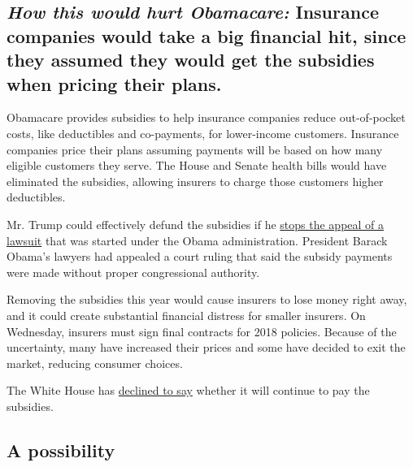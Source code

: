 \hypertarget{how-this-would-hurt-obamacare-insurance-companies-would-take-a-big-financial-hit-since-they-assumed-they-would-get-the-subsidies-when-pricing-their-plans}{%
\subsection{\texorpdfstring{\emph{How this would hurt Obamacare:}
Insurance companies would take a big financial hit, since they assumed
they would get the subsidies when pricing their
plans.}{How this would hurt Obamacare: Insurance companies would take a big financial hit, since they assumed they would get the subsidies when pricing their plans.}}\label{how-this-would-hurt-obamacare-insurance-companies-would-take-a-big-financial-hit-since-they-assumed-they-would-get-the-subsidies-when-pricing-their-plans}}

Obamacare provides subsidies to help insurance companies reduce
out-of-pocket costs, like deductibles and co-payments, for lower-income
customers. Insurance companies price their plans assuming payments will
be based on how many eligible customers they serve. The House and Senate
health bills would have eliminated the subsidies, allowing insurers to
charge those customers higher deductibles.

Mr. Trump could effectively defund the subsidies if he
\href{https://www.nytimes3xbfgragh.onion/2017/03/24/upshot/trumps-choice-on-obamacare-sabotage-or-co-opt.html}{stops
the appeal of a lawsuit} that was started under the Obama
administration. President Barack Obama's lawyers had appealed a court
ruling that said the subsidy payments were made without proper
congressional authority.

Removing the subsidies this year would cause insurers to lose money
right away, and it could create substantial financial distress for
smaller insurers. On Wednesday, insurers must sign final contracts for
2018 policies. Because of the uncertainty, many have increased their
prices and some have decided to exit the market, reducing consumer
choices.

The White House has
\href{https://www.nytimes3xbfgragh.onion/2017/07/18/upshot/obamacares-future-now-depends-on-an-unhappy-white-house.html}{declined
to say} whether it will continue to pay the subsidies.

\hypertarget{a-possibility-1}{%
\subsection{A possibility}\label{a-possibility-1}}

